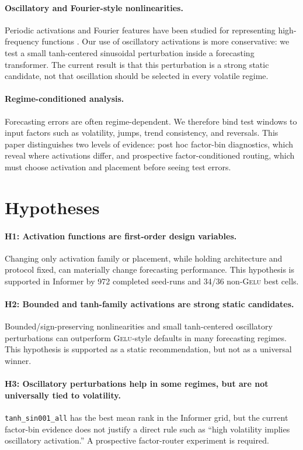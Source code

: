 \documentclass{article}
\newcommand{\gelu}{\textsc{Gelu}}
\begin{document}
\paragraph{Oscillatory and Fourier-style nonlinearities.}
Periodic activations and Fourier features have been studied for representing high-frequency functions \citep{sitzmann2020siren,tancik2020fourier}. Our use of oscillatory activations is more conservative: we test a small tanh-centered sinusoidal perturbation inside a forecasting transformer. The current result is that this perturbation is a strong static candidate, not that oscillation should be selected in every volatile regime.

\paragraph{Regime-conditioned analysis.}
Forecasting errors are often regime-dependent. We therefore bind test windows to input factors such as volatility, jumps, trend consistency, and reversals. This paper distinguishes two levels of evidence: post hoc factor-bin diagnostics, which reveal where activations differ, and prospective factor-conditioned routing, which must choose activation and placement before seeing test errors.

\section{Hypotheses}

\paragraph{H1: Activation functions are first-order design variables.}
Changing only activation family or placement, while holding architecture and protocol fixed, can materially change forecasting performance. This hypothesis is supported in Informer by 972 completed seed-runs and 34/36 non-\gelu{} best cells.

\paragraph{H2: Bounded and tanh-family activations are strong static candidates.}
Bounded/sign-preserving nonlinearities and small tanh-centered oscillatory perturbations can outperform \gelu{}-style defaults in many forecasting regimes. This hypothesis is supported as a static recommendation, but not as a universal winner.

\paragraph{H3: Oscillatory perturbations help in some regimes, but are not universally tied to volatility.}
\texttt{tanh\_sin001\_all} has the best mean rank in the Informer grid, but the current factor-bin evidence does not justify a direct rule such as ``high volatility implies oscillatory activation.'' A prospective factor-router experiment is required.
\end{document}
